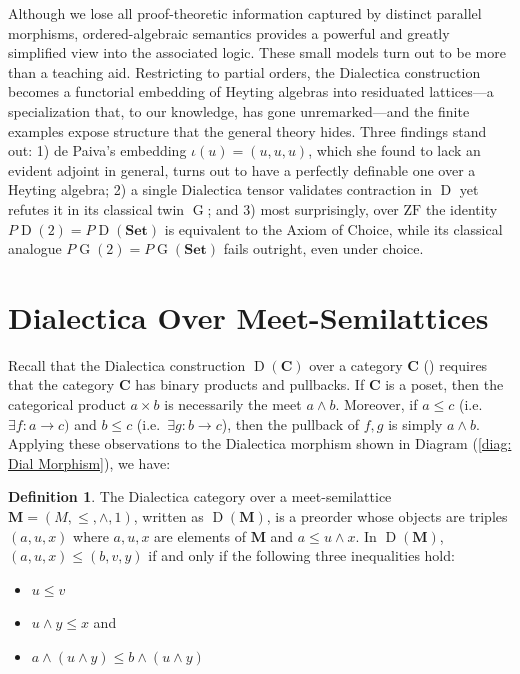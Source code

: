 \documentclass[reqno]{amsart}
\theoremstyle{plain}
\theoremstyle{definition}
\newtheorem{defn}[thm]{Definition}
\newcommand{\Set}{\mathbf{Set}}
\DeclareMathOperator{\D}{D}
\DeclareMathOperator{\G}{G}
\newcommand{\cf}[1]{\mathbf{#1}}
\begin{document}
Although we lose all proof-theoretic information captured by distinct parallel morphisms, ordered-algebraic semantics provides a powerful and greatly simplified view into the associated logic.
These small models turn out to be more than a teaching aid. Restricting to partial orders, the Dialectica construction becomes a functorial embedding of Heyting algebras into residuated lattices---a specialization that, to our knowledge, has gone unremarked---and the finite examples expose structure that the general theory hides. Three findings stand out: 1) de Paiva's embedding $\iota(u) = (u,u,u)$, which she found to lack an evident adjoint in general, turns out to have a perfectly definable one over a Heyting algebra; 2) a single Dialectica tensor validates contraction in $\D$ yet refutes it in its classical twin $\G$; and 3) most surprisingly, over $\mathrm{ZF}$ the identity $ P \D(2) = P\D(\Set)$ is equivalent to the Axiom of Choice, while its classical analogue $ P \G(2) = P\G(\Set)$ fails outright, even under choice.
 

\section{Dialectica Over Meet-Semilattices}


Recall that the Dialectica construction $\D(\cf{C}) $  over a category $\cf{C} $ (\cite{dial_cats1989}) requires that the category $\cf{C} $ has binary products and pullbacks. If $\cf{C} $ is a poset, then the categorical product $a \times b $ is necessarily the meet $ a \wedge b $. Moreover, if $ a \leq c $ (i.e.\ $\exists f \colon a \to c) $ and $ b \leq c $ (i.e.\ $\exists g: b \to c$), then the pullback  of $f,g$ is simply $a \wedge b $. Applying these observations to the Dialectica morphism shown in Diagram (\ref{diag: Dial Morphism}), we have:
\begin{defn}
 The Dialectica category over a meet-semilattice $\cf{M}=(M, \leq, \wedge, 1)$, written as $\D (\cf{M})$, is a preorder whose objects are triples $(a, u, x)$ where $a, u, x$ are elements of $\cf{M}$ and $a\leq u\wedge x$. In $\D (\cf{M})$, $(a, u, x) \leq (b, v, y)$ if and only if the following three inequalities hold:
\begin{itemize}
\item[(i)] $u \leq v$
\item[(ii)] $ u \wedge y \leq x$ {and} 
\item[(iii)] $a \wedge (u \wedge y) \leq b\wedge (u \wedge y)$
\end{itemize}   
\end{defn}
\end{document}
